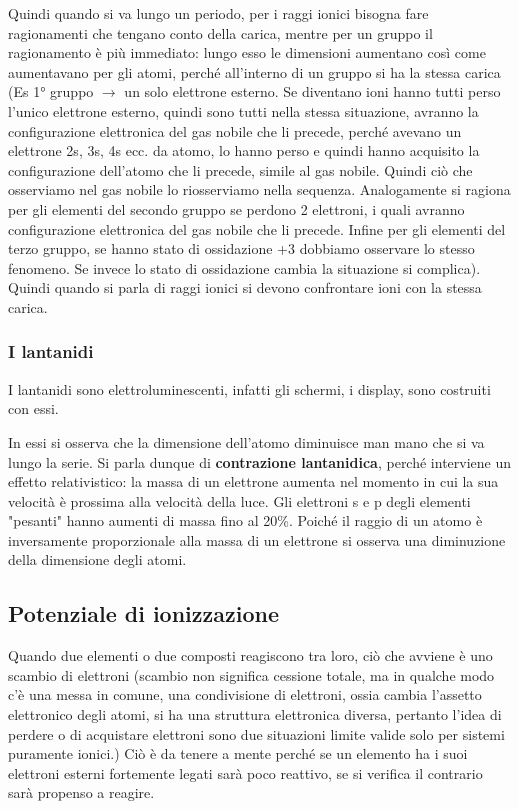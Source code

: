 
Quindi quando si va lungo un periodo, per i raggi ionici bisogna fare ragionamenti che tengano conto della carica, mentre per un gruppo il ragionamento è più immediato: lungo esso le dimensioni aumentano così come aumentavano per gli atomi, perché all'interno di un gruppo si ha la stessa carica (Es 1° gruppo $\rightarrow$ un solo elettrone esterno. Se diventano ioni hanno tutti perso l'unico elettrone esterno, quindi sono tutti nella stessa situazione, avranno la configurazione elettronica del gas nobile che li precede, perché avevano un elettrone 2s, 3s, 4s ecc. da atomo, lo hanno perso e quindi hanno acquisito la configurazione dell'atomo che li precede, simile al gas nobile. Quindi ciò che osserviamo nel gas nobile lo riosserviamo nella sequenza. Analogamente si ragiona per gli elementi del secondo gruppo se perdono 2 elettroni, i quali avranno configurazione elettronica del gas nobile che li precede. Infine per gli elementi del terzo gruppo, se hanno stato di ossidazione +3 dobbiamo osservare lo stesso fenomeno. Se invece lo stato di ossidazione cambia la situazione si complica). Quindi quando si parla di raggi ionici si devono confrontare ioni con la stessa carica.
\subsubsection{I lantanidi}
I lantanidi sono elettroluminescenti, infatti gli schermi, i display, sono costruiti con essi.

In essi si osserva che la dimensione dell'atomo diminuisce man mano che si va lungo la serie. Si parla dunque di \textbf{contrazione lantanidica}, perché interviene un effetto relativistico: la massa di un elettrone aumenta nel momento in cui la sua velocità è prossima alla velocità della luce. Gli elettroni s e p degli elementi "pesanti" hanno aumenti di massa fino al 20\%. Poiché il raggio di un atomo è inversamente proporzionale alla massa di un elettrone si osserva una diminuzione della dimensione degli atomi.
\subsection{Potenziale di ionizzazione}
Quando due elementi o due composti reagiscono tra loro, ciò che avviene è uno scambio di elettroni (scambio non significa cessione totale, ma in qualche modo c'è una messa in comune, una condivisione di elettroni, ossia cambia l'assetto elettronico degli atomi, si ha una struttura elettronica diversa, pertanto l'idea di perdere o di acquistare elettroni sono due situazioni limite valide solo per sistemi puramente ionici.) Ciò è da tenere a mente perché se un elemento ha i suoi elettroni esterni fortemente legati sarà poco reattivo, se si verifica il contrario sarà propenso a reagire.

